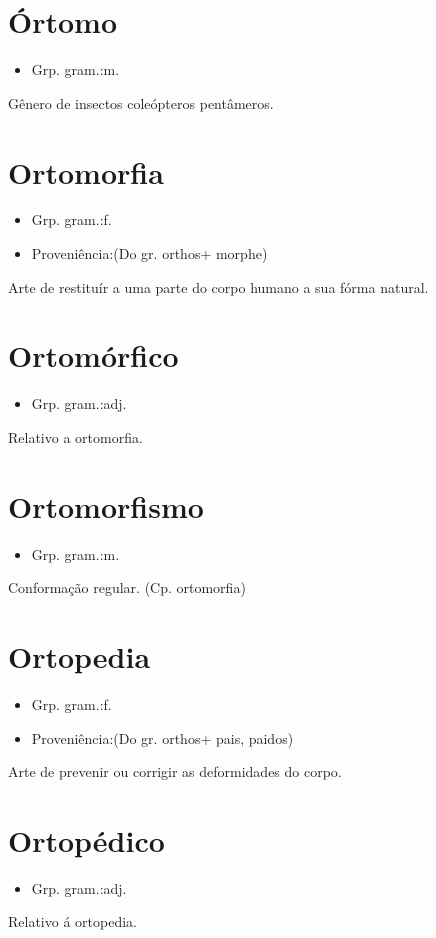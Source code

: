 \section{Órtomo}
\begin{itemize}
\item {Grp. gram.:m.}
\end{itemize}
Gênero de insectos coleópteros pentâmeros.
\section{Ortomorfia}
\begin{itemize}
\item {Grp. gram.:f.}
\end{itemize}
\begin{itemize}
\item {Proveniência:(Do gr. \textunderscore orthos\textunderscore  + \textunderscore morphe\textunderscore )}
\end{itemize}
Arte de restituír a uma parte do corpo humano a sua fórma natural.
\section{Ortomórfico}
\begin{itemize}
\item {Grp. gram.:adj.}
\end{itemize}
Relativo a ortomorfia.
\section{Ortomorfismo}
\begin{itemize}
\item {Grp. gram.:m.}
\end{itemize}
Conformação regular.
(Cp. \textunderscore ortomorfia\textunderscore )
\section{Ortopedia}
\begin{itemize}
\item {Grp. gram.:f.}
\end{itemize}
\begin{itemize}
\item {Proveniência:(Do gr. \textunderscore orthos\textunderscore  + \textunderscore pais\textunderscore , \textunderscore paidos\textunderscore )}
\end{itemize}
Arte de prevenir ou corrigir as deformidades do corpo.
\section{Ortopédico}
\begin{itemize}
\item {Grp. gram.:adj.}
\end{itemize}
Relativo á ortopedia.
